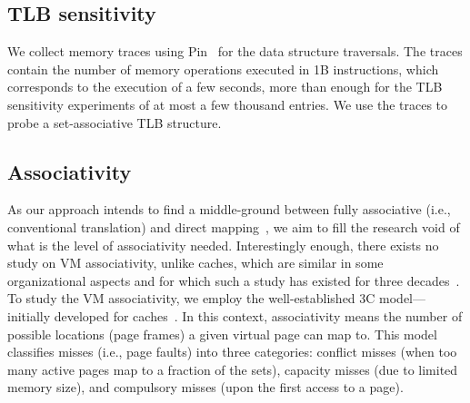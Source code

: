 \subsection{TLB sensitivity}

We collect memory traces using Pin~\cite{luk:pin} for the data structure traversals. The traces contain the number of memory operations executed in 1B instructions, which corresponds to the execution of a few seconds, more than enough for the TLB sensitivity experiments of at most a few thousand entries. We use the traces to probe a set-associative TLB structure. 

\subsection{Associativity}


As our approach intends to find a middle-ground between fully associative (i.e., conventional translation) and direct mapping~\cite{picorel:near-memory, haria:devirtualizing}, we aim to fill the research void of what is the level of associativity needed. Interestingly enough, there exists no study on VM associativity, unlike caches, which are similar in some organizational aspects and for which such a study has existed for three decades~\cite{hill:aspects}. To study the VM associativity, we employ the well-established 3C model---initially developed for caches~\cite{hill:aspects}. In this context, associativity means the number of possible locations (page frames) a given virtual page can map to. This model classifies misses (i.e., page faults) into three categories: conflict misses (when too many active pages map to a fraction of the sets), capacity misses (due to limited memory size), and compulsory misses (upon the first access to a page). 



